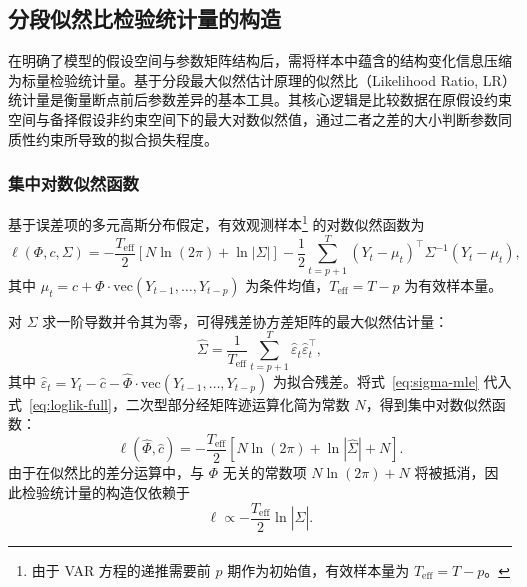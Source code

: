\subsection{分段似然比检验统计量的构造}\label{subsec:lr-statistic}

在明确了模型的假设空间与参数矩阵结构后，需将样本中蕴含的结构变化信息压缩为标量检验统计量。基于分段最大似然估计原理的似然比（Likelihood Ratio, LR）统计量是衡量断点前后参数差异的基本工具。其核心逻辑是比较数据在原假设约束空间与备择假设非约束空间下的最大对数似然值，通过二者之差的大小判断参数同质性约束所导致的拟合损失程度。

\subsubsection{集中对数似然函数}

基于误差项的多元高斯分布假定，有效观测样本\footnote{由于 VAR 方程的递推需要前 $p$ 期作为初始值，有效样本量为 $T_{\text{eff}} = T - p$。} 的对数似然函数为
\begin{equation}\label{eq:loglik-full}
    \ell(\Phi, c, \Sigma) = -\frac{T_{\text{eff}}}{2} \left[ N \ln(2\pi) + \ln|\Sigma| \right] - \frac{1}{2} \sum_{t=p+1}^{T} (Y_t - \mu_t)^\top \Sigma^{-1} (Y_t - \mu_t),
\end{equation}
其中 $\mu_t = c + \Phi \cdot \mathrm{vec}(Y_{t-1}, \ldots, Y_{t-p})$ 为条件均值，$T_{\text{eff}} = T - p$ 为有效样本量。

对 $\Sigma$ 求一阶导数并令其为零，可得残差协方差矩阵的最大似然估计量：
\begin{equation}\label{eq:sigma-mle}
    \hat{\Sigma} = \frac{1}{T_{\text{eff}}} \sum_{t=p+1}^{T} \hat{\varepsilon}_t \hat{\varepsilon}_t^\top,
\end{equation}
其中 $\hat{\varepsilon}_t = Y_t - \hat{c} - \hat{\Phi} \cdot \mathrm{vec}(Y_{t-1}, \ldots, Y_{t-p})$ 为拟合残差。将式~\eqref{eq:sigma-mle} 代入式~\eqref{eq:loglik-full}，二次型部分经矩阵迹运算化简为常数 $N$，得到集中对数似然函数：
\begin{equation}\label{eq:concentrated-loglik}
    \ell(\hat{\Phi}, \hat{c}) = -\frac{T_{\text{eff}}}{2} \left[ N \ln(2\pi) + \ln|\hat{\Sigma}| + N \right].
\end{equation}
由于在似然比的差分运算中，与 $\Phi$ 无关的常数项 $N\ln(2\pi) + N$ 将被抵消，因此检验统计量的构造仅依赖于
\begin{equation}\label{eq:loglik-core}
    \ell \propto -\frac{T_{\text{eff}}}{2} \ln|\hat{\Sigma}|.
\end{equation}

